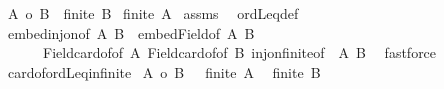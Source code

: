 \begin{isabellebody}
\ {\isachardoublequoteopen}{\isacharbar}{\kern0pt}A{\isacharbar}{\kern0pt}\ {\isasymle}o\ {\isacharbar}{\kern0pt}B{\isacharbar}{\kern0pt}{\isachardoublequoteclose}\ \ {\isachardoublequoteopen}finite\ B{\isachardoublequoteclose}\isanewline
{}\ {\isachardoublequoteopen}finite\ A{\isachardoublequoteclose}\isanewline
%
\isadelimproof
%
\endisadelimproof
%
\isatagproof
{}\isamarkupfalse%
\ assms\ \isamarkupfalse%
\ ordLeq{\isacharunderscore}{\kern0pt}def\isanewline
{}\isamarkupfalse%
\ embed{\isacharunderscore}{\kern0pt}inj{\isacharunderscore}{\kern0pt}on{\isacharbrackleft}{\kern0pt}of\ {\isachardoublequoteopen}{\isacharbar}{\kern0pt}A{\isacharbar}{\kern0pt}{\isachardoublequoteclose}\ {\isachardoublequoteopen}{\isacharbar}{\kern0pt}B{\isacharbar}{\kern0pt}{\isachardoublequoteclose}{\isacharbrackright}{\kern0pt}\ \ embed{\isacharunderscore}{\kern0pt}Field{\isacharbrackleft}{\kern0pt}of\ {\isachardoublequoteopen}{\isacharbar}{\kern0pt}A{\isacharbar}{\kern0pt}{\isachardoublequoteclose}\ {\isachardoublequoteopen}{\isacharbar}{\kern0pt}B{\isacharbar}{\kern0pt}{\isachardoublequoteclose}{\isacharbrackright}{\kern0pt}\isanewline
\ \ \ \ \ \ Field{\isacharunderscore}{\kern0pt}card{\isacharunderscore}{\kern0pt}of{\isacharbrackleft}{\kern0pt}of\ {\isachardoublequoteopen}A{\isachardoublequoteclose}{\isacharbrackright}{\kern0pt}\ Field{\isacharunderscore}{\kern0pt}card{\isacharunderscore}{\kern0pt}of{\isacharbrackleft}{\kern0pt}of\ {\isachardoublequoteopen}B{\isachardoublequoteclose}{\isacharbrackright}{\kern0pt}\ inj{\isacharunderscore}{\kern0pt}on{\isacharunderscore}{\kern0pt}finite{\isacharbrackleft}{\kern0pt}of\ {\isacharunderscore}{\kern0pt}\ {\isachardoublequoteopen}A{\isachardoublequoteclose}\ {\isachardoublequoteopen}B{\isachardoublequoteclose}{\isacharbrackright}{\kern0pt}\ \isamarkupfalse%
\ fastforce%
\endisatagproof
{\isafoldproof}%
%
\isadelimproof
\isanewline
%
\endisadelimproof
\isanewline
{}\isamarkupfalse%
\ card{\isacharunderscore}{\kern0pt}of{\isacharunderscore}{\kern0pt}ordLeq{\isacharunderscore}{\kern0pt}infinite{\isacharcolon}{\kern0pt}\isanewline
{}\ {\isachardoublequoteopen}{\isacharbar}{\kern0pt}A{\isacharbar}{\kern0pt}\ {\isasymle}o\ {\isacharbar}{\kern0pt}B{\isacharbar}{\kern0pt}{\isachardoublequoteclose}\ \ {\isachardoublequoteopen}{\isasymnot}\ finite\ A{\isachardoublequoteclose}\isanewline
{}\ {\isachardoublequoteopen}{\isasymnot}\ finite\ B{\isachardoublequoteclose}\isanewline

\end{isabellebody}

